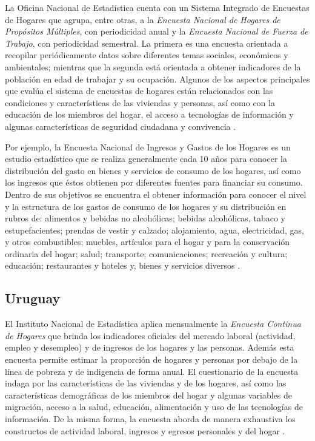 La Oficina Nacional de Estadística cuenta con un Sistema Integrado de Encuestas de Hogares que agrupa, entre otras, a la \emph{Encuesta Nacional de Hogares de Propósitos Múltiples}, con periodicidad anual y la \emph{Encuesta Nacional de Fuerza de Trabajo}, con periodicidad semestral. La primera es una encuesta orientada a recopilar periódicamente datos sobre diferentes temas sociales, económicos y ambientales; mientras que la segunda está orientada a obtener indicadores de la población en edad de trabajar y su ocupación. Algunos de los aspectos principales que evalúa el sistema de encuestas de hogares están relacionados con las condiciones y características de las viviendas y personas, así como con la educación de los miembros del hogar, el acceso a tecnologías de información y algunas características de seguridad ciudadana y convivencia \citep{ONE-DO}.

Por ejemplo, la Encuesta Nacional de Ingresos y Gastos de los Hogares es un estudio estadístico que se realiza generalmente cada 10 años para conocer la distribución del gasto en bienes y servicios de consumo de los hogares, así como los ingresos que éstos obtienen por diferentes fuentes para financiar su consumo. Dentro de sus objetivos se encuentra el obtener información para conocer el nivel y la estructura de los gastos de consumo de los hogares y su distribución en rubros de: alimentos y bebidas no alcohólicas; bebidas alcohólicas, tabaco y estupefacientes; prendas de vestir y calzado; alojamiento, agua, electricidad, gas, y otros combustibles; muebles, artículos para el hogar y para la conservación ordinaria del hogar; salud; transporte; comunicaciones; recreación y cultura; educación; restaurantes y hoteles y, bienes y servicios diversos \citep{ONE2-DO}.

\hypertarget{uruguay}{%
\subsection*{Uruguay}\label{uruguay}}


El Instituto Nacional de Estadística aplica mensualmente la \emph{Encuesta Continua de Hogares} que brinda los indicadores oficiales del mercado laboral (actividad, empleo y desempleo) y de ingresos de los hogares y las personas. Además esta encuesta permite estimar la proporción de hogares y personas por debajo de la línea de pobreza y de indigencia de forma anual. El cuestionario de la encuesta indaga por las características de las viviendas y de los hogares, así como las características demográficas de los miembros del hogar y algunas variables de migración, acceso a la salud, educación, alimentación y uso de las tecnologías de información. De la misma forma, la encuesta aborda de manera exhaustiva los constructos de actividad laboral, ingresos y egresos personales y del hogar \citep{INE-UY_2016}.

